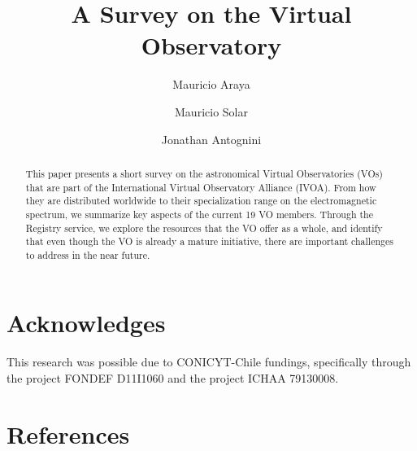 \documentclass[preprint]{elsarticle}
\begin{document}
\title{A Survey on the Virtual Observatory}

\author[utfsm]{Mauricio Araya}


\author[utfsm]{Mauricio Solar}


\author[utfsm]{Jonathan Antognini}


\address[utfsm]{Universidad T\'ecnica Federico Santa Mar\'ia\\
Avenida Espa\~na 1680, Valpara\'iso, Chile}

\begin{abstract}
This paper presents a short survey on the astronomical Virtual Observatories (VOs) that are 
part of the International Virtual Observatory Alliance (IVOA). From how they are
distributed worldwide to their specialization range on the electromagnetic spectrum, 
we summarize key aspects of the current 19 VO members. Through the Registry
service, we explore the resources that the VO offer as a whole, and identify 
that even though the VO is already a mature initiative, there are important
challenges to address in the near future.
\end{abstract}

\maketitle
















\section*{Acknowledges}
This research was possible due to CONICYT-Chile fundings, specifically 
through the project FONDEF D11I1060 and the project ICHAA 79130008.

\section{References}





%



\end{document}
